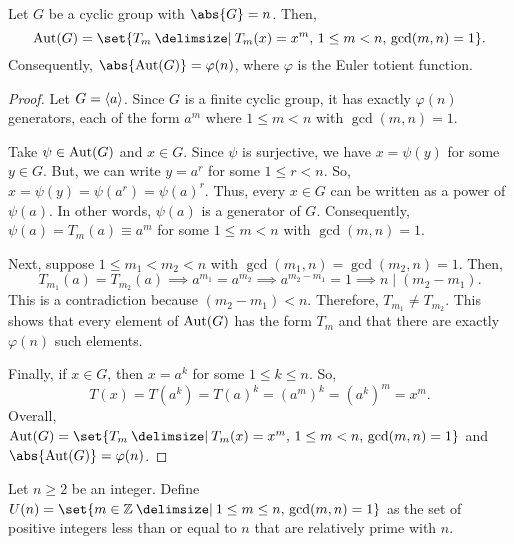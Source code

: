 \documentclass[11pt]{penrose}
\begin{document}
\begin{nthm}
    Let $G$ be a cyclic group with $\abs{G} = n$. Then,
    \begin{equation*}
        \Aut(G) = \set{T_{m} \st T_{m}(x) = x^{m},\, 1 \leq m < n,\, \gcd(m,n) = 1}.
    \end{equation*}
    Consequently, $\abs{\Aut(G)} = \varphi(n)$, where $\varphi$ is the Euler totient function.
\end{nthm}
\begin{proof}
    Let $G = \langle a\rangle$. Since $G$ is a finite cyclic group, it has exactly $\varphi(n)$ generators, each of the form $a^{m}$ where $1 \leq m < n$ with $\gcd(m,n) = 1$.

    Take $\psi \in \operatorname{Aut}(G)$ and $x \in G$. Since $\psi$ is surjective, we have $x = \psi(y)$ for some $y \in G$. But, we can write $y = a^{r}$ for some $1 \leq r < n$. So, $x = \psi(y) = \psi(a^{r}) = \psi(a)^{r}$. Thus, every $x \in G$ can be written as a power of $\psi(a)$. In other words, $\psi(a)$ is a generator of $G$. Consequently, $\psi(a) = T_{m}(a) \equiv a^{m}$ for some $1 \leq m < n$ with $\gcd(m,n) = 1$.

    Next, suppose $1 \leq m_{1} < m_{2} < n$ with $\gcd(m_{1}, n) = \gcd(m_{2}, n) = 1$. Then,
    \begin{equation*}
        T_{m_{1}}(a) = T_{m_{2}}(a)
        \implies a^{m_{1}} = a^{m_{2}}
        \implies a^{m_{2} - m_{1}} = 1
        \implies n \mid (m_{2} - m_{1}).
    \end{equation*}
    This is a contradiction because $(m_{2} - m_{1}) < n$. Therefore, $T_{m_{1}} \neq T_{m_{2}}$. This shows that every element of $\operatorname{Aut}(G)$ has the form $T_{m}$ and that there are exactly $\varphi(n)$ such elements.

    Finally, if $x \in G$, then $x = a^{k}$ for some $1 \leq k \leq n$. So,
    \begin{equation*}
        T(x) = T(a^{k}) = T(a)^{k} = (a^{m})^{k} = (a^{k})^{m} = x^{m}.
    \end{equation*}
    Overall, $\Aut(G) = \set{T_{m} \st T_{m}(x) = x^{m},\, 1 \leq m < n,\, \gcd(m,n) = 1}$ and $\abs{\Aut(G)} = \varphi(n)$.
\end{proof}

\begin{ndfn}
    Let $n \geq 2$ be an integer. Define $U(n) = \set{m \in \Z \st 1 \leq m \leq n,\, \gcd(m, n) = 1}$ as the set of positive integers less than or equal to $n$ that are relatively prime with $n$.
\end{ndfn}
\end{document}
